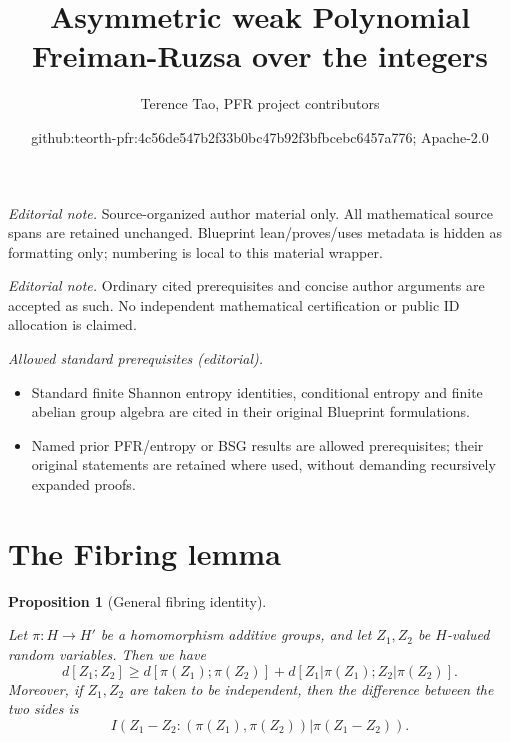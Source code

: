 \documentclass[10pt,a4paper]{article}
\title{Asymmetric weak Polynomial Freiman-Ruzsa over the integers}
\author{Terence Tao, PFR project contributors}
\date{github:teorth-pfr:4c56de547b2f33b0bc47b92f3bfbcebc6457a776; Apache-2.0}
\newtheorem{proposition}[theorem]{Proposition}
\newcommand{\lean}[1]{}
\newcommand{\leanok}{}
\newcommand{\chapter}[1]{\section{#1}}
\begin{document}
\maketitle
\noindent\textit{Editorial note.} Source-organized author material only. All mathematical source spans are retained unchanged. Blueprint lean/proves/uses metadata is hidden as formatting only; numbering is local to this material wrapper.\par\medskip
\noindent\textit{Editorial note.} Ordinary cited prerequisites and concise author arguments are accepted as such. No independent mathematical certification or public ID allocation is claimed.\par\medskip
\noindent\textit{Allowed standard prerequisites (editorial).}\begin{itemize}
\item Standard finite Shannon entropy identities, conditional entropy and finite abelian group algebra are cited in their original Blueprint formulations.
\item Named prior PFR/entropy or BSG results are allowed prerequisites; their original statements are retained where used, without demanding recursively expanded proofs.
\end{itemize}\medskip
\chapter{The Fibring lemma}

\begin{proposition}[General fibring identity]\label{fibring-ident}
  \lean{rdist_of_indep_eq_sum_fibre, rdist_le_sum_fibre}\leanok
  Let $\pi : H \to H'$ be a homomorphism additive groups, and let $Z_1,Z_2$ be $H$-valued random variables. Then we have
  \[
    d[Z_1; Z_2] \geq d[\pi(Z_1);\pi(Z_2)] + d[Z_1|\pi(Z_1); Z_2 |\pi(Z_2)].
  \]
  Moreover, if $Z_1,Z_2$ are taken to be independent, then the difference between the two sides is
$$I( Z_1 - Z_2 : (\pi(Z_1), \pi(Z_2))  |  \pi(Z_1 - Z_2) ).$$
\end{proposition}
\end{document}
